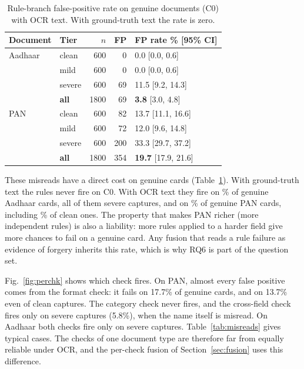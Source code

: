 \documentclass[conference]{IEEEtran}
\begin{document}
\begin{table}[!t]
\caption{Rule-branch false-positive rate on genuine documents (C0)
with OCR text. With ground-truth text the rate is zero.}
\label{tab:fpr}
\centering
\footnotesize
\setlength{\tabcolsep}{5pt}
\renewcommand{\arraystretch}{1.08}
\begin{tabular}{@{}llrrl@{}}
\toprule
Document & Tier & $n$ & FP & FP rate \% [95\% CI] \\
\midrule
Aadhaar & clean & 600 & 0 & 0.0 [0.0, 0.6] \\
 & mild & 600 & 0 & 0.0 [0.0, 0.6] \\
 & severe & 600 & 69 & 11.5 [9.2, 14.3] \\
 & \textbf{all} & 1800 & 69 & \textbf{3.8} [3.0, 4.8] \\
\midrule
PAN & clean & 600 & 82 & 13.7 [11.1, 16.6] \\
 & mild & 600 & 72 & 12.0 [9.6, 14.8] \\
 & severe & 600 & 200 & 33.3 [29.7, 37.2] \\
 & \textbf{all} & 1800 & 354 & \textbf{19.7} [17.9, 21.6] \\
\bottomrule
\end{tabular}
\end{table}

These misreads have a direct cost on genuine cards
(Table~\ref{tab:fpr}). With ground-truth text the rules never fire on
C0. With OCR text they fire on \dsFPAadhaarAll\% of genuine Aadhaar
cards, all of them severe captures, and on \dsFPPanAll\% of genuine PAN
cards, including \dsFPPanClean\% of clean ones. The property that makes
PAN richer (more independent rules) is also a liability: more rules
applied to a harder field give more chances to fail on a genuine card.
Any fusion that reads a rule failure as evidence of forgery inherits
this rate, which is why RQ6 is part of the question set.

Fig.~\ref{fig:perchk} shows which check fires. On PAN, almost every
false positive comes from the format check: it fails on 17.7\% of
genuine cards, and on 13.7\% even of clean captures. The category check
never fires, and the cross-field check fires only on severe captures
(5.8\%), when the name itself is misread. On Aadhaar both checks fire
only on severe captures. Table~\ref{tab:misreads} gives typical cases.
The checks of one document type are therefore far from equally reliable
under OCR, and the per-check fusion of Section~\ref{sec:fusion} uses
this difference.
\end{document}
